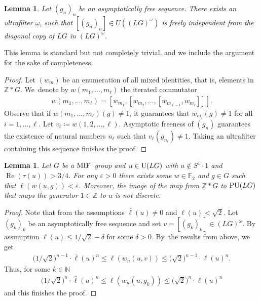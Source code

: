 \documentclass[pdftex]{sigma}
\numberwithin{equation}{section}
\newtheorem{Lemma}[Theorem]{Lemma}
\begin{document}
\begin{Lemma}
Let $(g_n)_n$ be an asymptotically free sequence. There exists an ultrafilter $\omega$, such that $[(g_n)_n] \in U((LG)^{\omega})$ is freely independent from the diagonal copy of $LG$ in $(LG)^\omega$.
\end{Lemma}
This lemma is standard but not completely trivial, and we include the argument for the sake of completeness.
\begin{proof}
Let $(w_m)$ be an enumeration of all mixed identities, that is, elements in $\mathbb Z\ast G$. We~denote by $w(m_1,\dots,m_\ell)$ the iterated commutator
\begin{gather*}
w(m_1,\dots,m_\ell) = [w_{m_1},[w_{m_2},\dots, [w_{m_{\ell-1}},w_{m_\ell}]]].
\end{gather*}
Observe that if $w(m_1,\dots,m_\ell)(g) \neq 1$, it guarantees that $w_{m_i}(g)\neq 1$ for all $i=1,\dots,\ell$. Let $v_\ell\coloneqq w(1,2,\dots,\ell)$. Asymptotic freeness of $(g_n)$ guarantees the existence of natural numbers $n_\ell$ such that $v_\ell(g_{n_\ell})\neq 1$. Taking an ultrafilter containing this sequence finishes the proof.
\end{proof}

\begin{Lemma}
Let $G$ be a ${\rm MIF}$~group and $u \in {\rm U}(LG)$ with $u \not \in S^1 \cdot 1$ and $\operatorname{Re}(\tau(u))>3/4$. For any $\varepsilon>0$ there exists some $w \in \mathbb F_2$ and $g \in G$ such that $\ell(w(u,g))< \varepsilon$. Moreover, the image of the map from $\mathbb Z \ast G$ to ${\rm PU}(LG)$ that maps the generator $1 \in \mathbb Z$ to $u$ is not discrete.
\end{Lemma}
\begin{proof}
Note that from the assumptions $\bar \ell(u) \neq 0$ and $\ell(u)< \sqrt{2}$.
Let $(g_k)_k$ be an asymptotically free sequence and set $v= [(g_k)_k] \in (LG)^{\omega}$. By assumption $\ell(u) \leq 1/\sqrt{2} - \delta$ for some $\delta>0$. By~the results from above, we get
\begin{gather*}
\big(1/\sqrt{2}\big)^{n-1} \cdot \bar\ell(u)^n \leq \ell(w_n(u,v)) \leq\big(\sqrt{2}\big)^{n-1} \cdot \ell(u)^n.
\end{gather*}
Thus, for some $k \in \mathbb N$
\begin{gather*}
\big(1/\sqrt{2}\big)^{n} \cdot \bar\ell(u)^n \leq \ell(w_n(u,g_k)) \leq \big(\sqrt{2}\big)^{n} \cdot \ell(u)^n
\end{gather*}
and this finishes the proof.
\end{proof}
\end{document}
